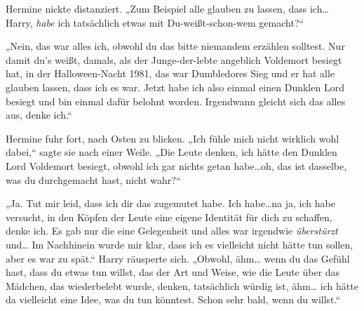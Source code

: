 Hermine nickte distanziert. „Zum Beispiel alle glauben zu lassen, dass ich… Harry, \emph{habe} ich tatsächlich etwas mit Du-weißt-schon-wem gemacht?“

„Nein, das war alles ich, obwohl du das bitte niemandem erzählen solltest. Nur damit du’s weißt, damals, als der Junge-der-lebte angeblich Voldemort besiegt hat, in der Halloween-Nacht 1981, das war Dumbledores Sieg und er hat alle glauben lassen, dass ich es war. Jetzt habe ich also einmal einen Dunklen Lord besiegt und bin einmal dafür belohnt worden. Irgendwann gleicht sich das alles aus, denke ich.“

Hermine fuhr fort, nach Osten zu blicken.
„Ich fühle mich nicht wirklich wohl dabei,“ sagte sie nach einer Weile. „Die Leute denken, ich hätte den Dunklen Lord Voldemort besiegt, obwohl ich gar nichts getan habe…oh, das ist dasselbe, was du durchgemacht hast, nicht wahr?“

„Ja. Tut mir leid, dass ich dir das zugemutet habe. Ich habe…na ja, ich habe versucht, in den Köpfen der Leute eine eigene Identität für dich zu schaffen, denke ich. Es gab nur die eine Gelegenheit und alles war irgendwie \emph{überstürzt} und… Im Nachhinein wurde mir klar, dass ich es vielleicht nicht hätte tun sollen, aber es war zu spät.“ Harry räusperte sich. „Obwohl, ähm… wenn du das Gefühl hast, dass du etwas tun willst, das der Art und Weise, wie die Leute über das Mädchen, das wiederbelebt wurde, denken, tatsächlich würdig ist, ähm… ich hätte da vielleicht eine Idee, was du tun könntest. Schon sehr bald, wenn du willst.“


